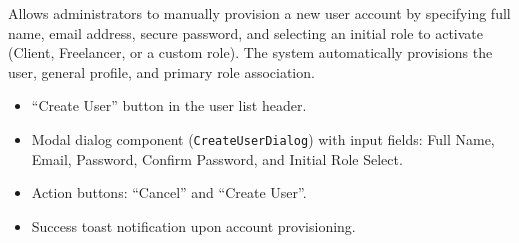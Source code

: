 \noindent Allows administrators to manually provision a new user account by specifying full name, email address, secure password, and selecting an initial role to activate (Client, Freelancer, or a custom role). The system automatically provisions the user, general profile, and primary role association.

\begin{itemize}[leftmargin=1.6em,topsep=3pt,itemsep=2pt,parsep=0pt,label=$\bullet$]
    \item ``Create User'' button in the user list header.
    \item Modal dialog component (\texttt{CreateUserDialog}) with input fields: Full Name, Email, Password, Confirm Password, and Initial Role Select.
    \item Action buttons: ``Cancel'' and ``Create User''.
    \item Success toast notification upon account provisioning.
\end{itemize}

